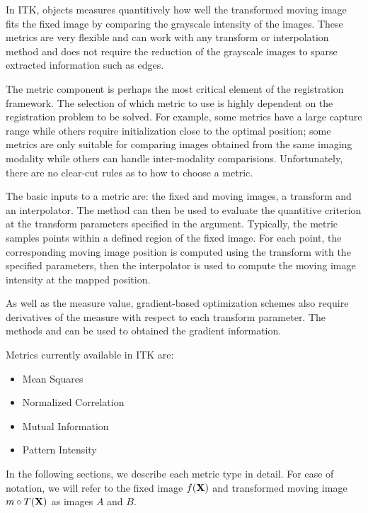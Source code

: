 

In ITK,  objects measures quantitively 
how well the transformed moving image fits the fixed image by comparing 
the grayscale intensity of the images. These metrics are very flexible
and can work with any transform or interpolation method and does not
require the reduction of the grayscale images to sparse extracted
information such as edges.

The metric component is perhaps the most critical element of the
registration framework. The selection of which metric to use is highly
dependent on the registration problem to be solved. For example, some metrics
have a large capture range while others require initialization close to
the optimal position; some metrics are only suitable for comparing 
images obtained from the same imaging modality while others can handle
inter-modality comparisions. Unfortunately, there are no clear-cut rules
as to how to choose a metric.


The basic inputs to a metric are: the fixed and moving images, a
transform and an interpolator. The method  can
then be used to evaluate the quantitive criterion at the transform
parameters specified in the argument. Typically, the metric samples 
points within a defined region of the fixed image. 
For each point, the corresponding moving image position is
computed using the transform with the specified parameters, 
then the interpolator is used to compute the moving image intensity 
at the mapped position.

As well as the measure value, gradient-based optimization schemes also require
derivatives of the measure with respect to each transform parameter. The
methods  and  can be used
to obtained the gradient information.


Metrics currently available in ITK are:
\begin{itemize}
\item Mean Squares
\item Normalized Correlation
\item Mutual Information
\item Pattern Intensity
\end{itemize}
In the following sections, we describe each metric type in detail. 
For ease of notation, we will refer to the fixed image $f(\bf{X})$ 
and transformed moving image $m \circ T(\bf{X})$ as images $A$ and $B$.

